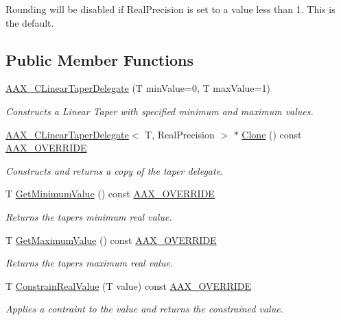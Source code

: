 Rounding will be disabled if Real\+Precision is set to a value less than 1. This is the default. \subsection*{Public Member Functions}
\begin{DoxyCompactItemize}
\item 
\mbox{\hyperlink{a01493_a790c48a2dd573b3304cf4cc117d97a95}{A\+A\+X\+\_\+\+C\+Linear\+Taper\+Delegate}} (T min\+Value=0, T max\+Value=1)
\begin{DoxyCompactList}\small\item\em Constructs a Linear Taper with specified minimum and maximum values. \end{DoxyCompactList}\item 
\mbox{\hyperlink{a01493}{A\+A\+X\+\_\+\+C\+Linear\+Taper\+Delegate}}$<$ T, Real\+Precision $>$ $\ast$ \mbox{\hyperlink{a01493_a022c70f963f1fb15238d21199d2d0ed9}{Clone}} () const \mbox{\hyperlink{a00392_ac2f24a5172689ae684344abdcce55463}{A\+A\+X\+\_\+\+O\+V\+E\+R\+R\+I\+DE}}
\begin{DoxyCompactList}\small\item\em Constructs and returns a copy of the taper delegate. \end{DoxyCompactList}\item 
T \mbox{\hyperlink{a01493_aa8874bf8cb7b62ae363cb3d9587efb12}{Get\+Minimum\+Value}} () const \mbox{\hyperlink{a00392_ac2f24a5172689ae684344abdcce55463}{A\+A\+X\+\_\+\+O\+V\+E\+R\+R\+I\+DE}}
\begin{DoxyCompactList}\small\item\em Returns the taper\textquotesingle{}s minimum real value. \end{DoxyCompactList}\item 
T \mbox{\hyperlink{a01493_a52dccdec4565f1057a4a5b304fc51161}{Get\+Maximum\+Value}} () const \mbox{\hyperlink{a00392_ac2f24a5172689ae684344abdcce55463}{A\+A\+X\+\_\+\+O\+V\+E\+R\+R\+I\+DE}}
\begin{DoxyCompactList}\small\item\em Returns the taper\textquotesingle{}s maximum real value. \end{DoxyCompactList}\item 
T \mbox{\hyperlink{a01493_aad9ea52c4f3c4cae45b6d5309c2833de}{Constrain\+Real\+Value}} (T value) const \mbox{\hyperlink{a00392_ac2f24a5172689ae684344abdcce55463}{A\+A\+X\+\_\+\+O\+V\+E\+R\+R\+I\+DE}}
\begin{DoxyCompactList}\small\item\em Applies a contraint to the value and returns the constrained value. \end{DoxyCompactList}\item 

\end{DoxyCompactItemize}
